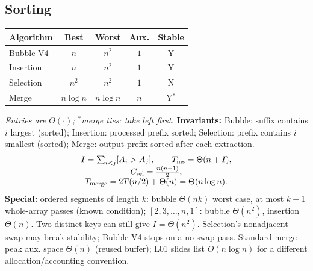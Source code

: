 \subsection{Sorting}
\begingroup\setlength{\tabcolsep}{2pt}\renewcommand{\arraystretch}{1.03}
\begin{tabular}{@{}lcccc@{}}
\textbf{Algorithm} & \textbf{Best} & \textbf{Worst} & \textbf{Aux.} & \textbf{Stable}\\\hline
Bubble V4 & $n$ & $n^2$ & $1$ & Y\\
Insertion & $n$ & $n^2$ & $1$ & Y\\
Selection & $n^2$ & $n^2$ & $1$ & N\\
Merge & $n\log n$ & $n\log n$ & $n$ & Y$^*$
\end{tabular}\endgroup
\par\emph{Entries are $\Theta(\cdot)$; $^*$merge ties: take left first.}
\textbf{Invariants:} Bubble: suffix contains $i$ largest (sorted);
Insertion: processed prefix sorted;
Selection: prefix contains $i$ smallest (sorted);
Merge: output prefix sorted after each extraction.
\[
\begin{array}{@{}c@{}}
I=\sum_{i<j}[A_i>A_j],\qquad T_{\rm ins}=\Theta(n+I),\\
C_{\rm sel}=\frac{n(n-1)}2,\\
T_{\rm merge}=2T(n/2)+\Theta(n)=\Theta(n\log n).
\end{array}
\]
\textbf{Special:} ordered segments of length $k$: bubble $\Theta(nk)$ worst case, at most $k-1$ whole-array passes (known condition);
$[2,3,\ldots,n,1]$: bubble $\Theta(n^2)$, insertion $\Theta(n)$.
Two distinct keys can still give $I=\Theta(n^2)$.
Selection's nonadjacent swap may break stability; Bubble V4 stops on a no-swap pass.
Standard merge peak aux. space $\Theta(n)$ (reused buffer); L01 slides list $O(n\log n)$ for a different allocation/accounting convention.

